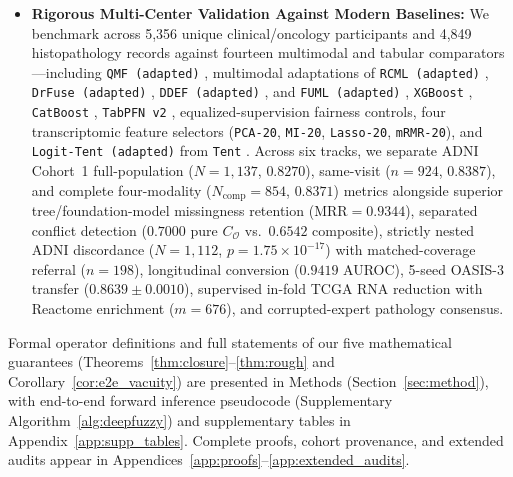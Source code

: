 \documentclass[10pt,twocolumn]{article}
\begin{document}
\begin{itemize}[leftmargin=1.3em,itemsep=1pt,topsep=2pt]
    TSK head operates on $C \le 8$ masked clinical and modality net-support concepts,
    reconstructing Fold-0 validation logits within $2.84 \times 10^{-7}$ from structured
    float32 dictionaries and $2.384 \times 10^{-7}$ ($\le 2.39 \times 10^{-7}$) when parsed
    directly from human-readable 8-decimal \texttt{IF--THEN} text rules via
    \texttt{evaluate\_\allowbreak exported\_\allowbreak rules\_\allowbreak text()}.
    \item \textbf{Rigorous Multi-Center Validation Against Modern Baselines:} We benchmark
    across 5,356 unique clinical/oncology participants and 4,849 histopathology records against
    fourteen multimodal and tabular comparators---including \texttt{QMF (adapted)}
    \cite{zhang2023provable},
    multimodal adaptations of \texttt{RCML (adapted)} \cite{xu2024reliable},
    \texttt{DrFuse (adapted)}
    \cite{yao2024drfuse}, \texttt{DDEF (adapted)} \cite{shao2024dual}, and \texttt{FUML
    (adapted)}
    \cite{duan2025fuml}, \texttt{XGBoost} \cite{chen2016xgboost}, \texttt{CatBoost}
    \cite{prokhorenkova2018catboost}, \texttt{TabPFN~v2} \cite{hollmann2025tabpfn},
    equalized-supervision fairness controls, four transcriptomic feature selectors
    (\texttt{PCA-20}, \texttt{MI-20}, \texttt{Lasso-20}, \texttt{mRMR-20}), and
    \texttt{Logit-Tent (adapted)} from \texttt{Tent} \cite{wang2021tent}. Across six tracks, we
    separate ADNI Cohort~1 full-population ($N=1,137$, $0.8270$), same-visit ($n=924$,
    $0.8387$), and complete four-modality ($N_{\text{comp}}=854$, $0.8371$) metrics alongside
    superior tree/foundation-model missingness retention ($\text{MRR}=0.9344$), separated
    conflict detection ($0.7000$ pure $C_{\mathcal{O}}$ vs.\ $0.6542$ composite), strictly
    nested
    ADNI discordance ($N=1,112$, $p=1.75\times 10^{-17}$) with matched-coverage referral
    ($n=198$), longitudinal conversion ($0.9419$ AUROC), 5-seed OASIS-3 transfer ($0.8639\pm
    0.0010$), supervised in-fold TCGA RNA reduction with Reactome enrichment ($m=676$), and
    corrupted-expert pathology consensus.
\end{itemize}

Formal operator definitions and full statements of our five mathematical guarantees
(Theorems~\ref{thm:closure}--\ref{thm:rough} and Corollary~\ref{cor:e2e_vacuity}) are presented
in Methods (Section~\ref{sec:method}), with end-to-end forward inference pseudocode
(Supplementary Algorithm~\ref{alg:deepfuzzy}) and supplementary tables in
Appendix~\ref{app:supp_tables}. Complete proofs, cohort provenance, and extended audits appear
in Appendices~\ref{app:proofs}--\ref{app:extended_audits}.
\end{document}
